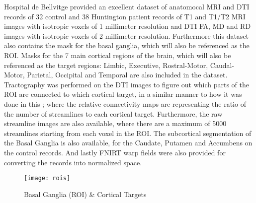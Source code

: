  \par

Hospital de Bellvitge provided an excellent dataset of anatomocal \ac{MRI} and \ac{DTI} records of 32 control and 38 Huntington patient records of T1 and T1/T2 \ac{MRI} images with isotropic voxels of 1 millimeter resolution and \ac{DTI} \ac{FA}, \ac{MD} and \ac{RD} images with isotropic voxels of 2 millimeter resolution. Furthermore this dataset also contains the mask for the basal ganglia, which will also be referenced as the \ac{ROI}. Masks for the 7 main cortical regions of the brain, which will also be referenced as the target regions: Limbic, Executive, Rostral-Motor, Caudal-Motor, Parietal, Occipital and Temporal are also included in the dataset. Tractography was performed on the \ac{DTI} images to figure out which parts of the \ac{ROI} are connected to which cortical target, in a similar manner to how it was done in this ; where the relative connectivity maps are representing the ratio of the number of streamlines to each cortical target. Furthermore, the raw streamline images are also available, where there are a maximum of 5000 streamlines starting from each voxel in the \ac{ROI}. The subcortical segmentation of the Basal Ganglia is also available, for the Caudate, Putamen and Accumbens on the control records. And lastly \ac{FNIRT} warp fields were also provided for converting the records into normalized space.\par

\begin{figure}[H]
\centering
\texttt{[image: rois]}
\caption{Basal Ganglia (ROI) \& Cortical Targets}
\label{fig:rois}
\end{figure}

